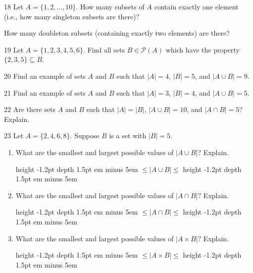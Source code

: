 \documentclass[11pt,]{book}
\newcommand{\fillin}[1]{\leavevmode\leaders\vrule height -1.2pt depth 1.5pt \hskip #1em minus #1em \null}
\theoremstyle{ptxplainnotitle}
\theoremstyle{ptxplaintitle}
\theoremstyle{ptxdefinitionnotitle}
\theoremstyle{ptxdefinitiontitle}
\theoremstyle{ptxdefinitionnotitle}
\theoremstyle{ptxdefinitiontitle}
\theoremstyle{ptxdefinitionnotitle}
\theoremstyle{ptxdefinitiontitle}
\theoremstyle{ptxdefinitiontitlenonumber}
\theoremstyle{ptxdefinitiontitlenonumber}
\numberwithin{equation}{chapter}
\newcommand{\pow}{\mathcal P}
\begin{document}
\begin{divisionexercise}{18}\hypertarget{exercise-95}{}
\hypertarget{p-970}{}%
Let \(A = \{1,2,\ldots, 10\}\text{.}\) How many subsets of \(A\) contain exactly one element (i.e., how many singleton subsets are there)?%
\par
\hypertarget{p-972}{}%
How many doubleton subsets (containing exactly two elements) are there?%
\end{divisionexercise}%
\begin{divisionexercise}{19}\hypertarget{exercise-96}{}
\hypertarget{p-975}{}%
Let \(A = \{1,2,3,4,5,6\}\). Find all sets \(B \in \pow(A)\) which have the property \(\{2,3,5\} \subseteq B\).%
\end{divisionexercise}%
\begin{divisionexercise}{20}\hypertarget{exercise-97}{}
\hypertarget{p-977}{}%
Find an example of sets \(A\) and \(B\) such that \(|A| = 4\), \(|B| = 5\), and \(|A \cup B| = 9\).%
\end{divisionexercise}%
\begin{divisionexercise}{21}\hypertarget{exercise-98}{}
\hypertarget{p-979}{}%
Find an example of sets \(A\) and \(B\) such that \(|A| = 3\), \(|B| = 4\), and \(|A \cup B| = 5\).%
\end{divisionexercise}%
\begin{divisionexercise}{22}\hypertarget{exercise-99}{}
\hypertarget{p-981}{}%
Are there sets \(A\) and \(B\) such that \(|A| = |B|\), \(|A\cup B| = 10\), and \(|A\cap B| = 5\)? Explain.%
\end{divisionexercise}%
\begin{divisionexercise}{23}\hypertarget{exercise-100}{}
\hypertarget{p-994}{}%
Let \(A = \{2, 4, 6, 8\}\text{.}\)  Suppose \(B\) is a set with \(|B| = 5\text{.}\) \leavevmode%
\begin{enumerate}[label=\alph*.]
\item\hypertarget{li-439}{}\hypertarget{p-995}{}%
What are the smallest and largest possible values of \(|A \cup B|\text{?}\)  Explain.%
\par
\hypertarget{p-996}{}%
 \fillin{5} \(\le |A \cup B| \le\)  \fillin{5}%
\item\hypertarget{li-440}{}\hypertarget{p-997}{}%
What are the smallest and largest possible values of \(|A \cap B|\text{?}\)  Explain.%
\par
\hypertarget{p-998}{}%
 \fillin{5} \(\le |A \cap B| \le\)  \fillin{5}%
\item\hypertarget{li-441}{}\hypertarget{p-999}{}%
What are the smallest and largest possible values of \(|A \times B|\text{?}\)  Explain.%
\par
\hypertarget{p-1000}{}%
 \fillin{5} \(\le |A \times B| \le\)  \fillin{5}%
\end{enumerate}
%
\end{divisionexercise}%
\end{document}
